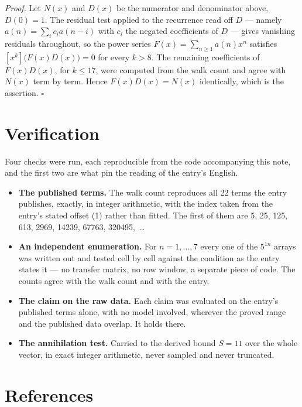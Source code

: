 \documentclass[11pt]{article}
\theoremstyle{definition}
\begin{document}
{\itshape Proof.} Let $N(x)$ and $D(x)$ be the numerator and denominator above, $D(0)=1$. The residual test applied to the recurrence read off $D$ --- namely $a(n) = \sum_i c_i a(n-i)$ with $c_i$ the negated coefficients of $D$ --- gives vanishing residuals throughout, so the power series $F(x)=\sum_{n\ge 1}a(n)x^n$ satisfies $[x^k]\bigl(F(x)D(x)\bigr) = 0$ for every $k > 8$. The remaining coefficients of $F(x)D(x)$, for $k \le 17$, were computed from the walk count and agree with $N(x)$ term by term. Hence $F(x)D(x) = N(x)$ identically, which is the assertion. $\square$

\section{Verification}

Four checks were run, each reproducible from the code accompanying this note, and the first two are what pin the reading of the entry's English.

\begin{itemize}

\item {\bfseries The published terms.} The walk count reproduces all 22 terms the entry publishes, exactly, in integer arithmetic, with the index taken from the entry's stated offset (1) rather than fitted. The first of them are 5, 25, 125, 613, 2969, 14239, 67763, 320495,~\dots

\item {\bfseries An independent enumeration.} For $n = 1,\dots,7$ every one of the $5^{1n}$ arrays was written out and tested cell by cell against the condition as the entry states it --- no transfer matrix, no row window, a separate piece of code. The counts agree with the walk count and with the entry.

\item {\bfseries The claim on the raw data.} Each claim was evaluated on the entry's published terms alone, with no model involved, wherever the proved range and the published data overlap. It holds there.

\item {\bfseries The annihilation test.} Carried to the derived bound $S = 11$ over the whole vector, in exact integer arithmetic, never sampled and never truncated.

\end{itemize}

\section{References}
\end{document}
